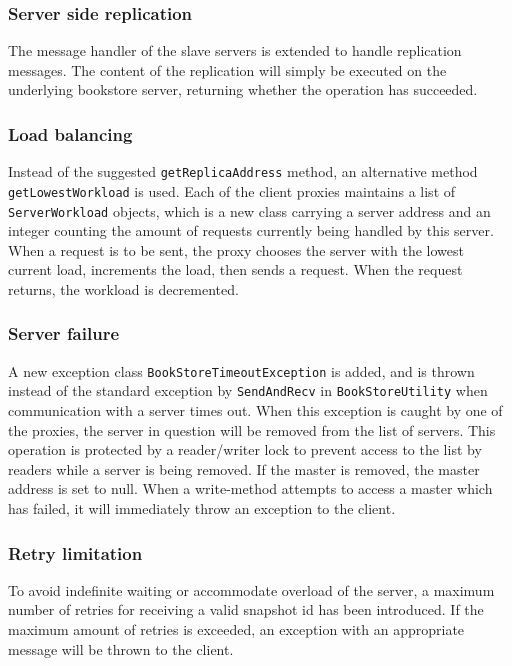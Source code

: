 \documentclass[12pt]{article}
\begin{document}
\subsubsection*{Server side replication}
The message handler of the slave servers is extended to handle replication messages. The content of the replication will simply be executed on the underlying bookstore server, returning whether the operation has succeeded.
\subsubsection*{Load balancing}
Instead of the suggested \verb|getReplicaAddress| method, an alternative method \verb|getLowestWorkload| is used. Each of the client proxies maintains a list of \verb|ServerWorkload| objects, which is a new class carrying a server address and an integer counting the amount of requests currently being handled by this server. When a request is to be sent, the proxy chooses the server with the lowest current load, increments the load, then sends a request. When the request returns, the workload is decremented.
\subsubsection*{Server failure}
A new exception class \verb|BookStoreTimeoutException| is added, and is thrown instead of the standard exception by \verb|SendAndRecv| in \verb|BookStoreUtility| when communication with a server times out. When this exception is caught by one of the proxies, the server in question will be removed from the list of servers. This operation is protected by a reader/writer lock to prevent access to the list by readers while a server is being removed. If the master is removed, the master address is set to null. When a write-method attempts to access a master which has failed, it will immediately throw an exception to the client.
\subsubsection*{Retry limitation}
To avoid indefinite waiting or accommodate overload of the server, a maximum number of retries for receiving a valid snapshot id has been introduced. If the maximum amount of retries is exceeded, an exception with an appropriate message will be thrown to the client.
\end{document}
